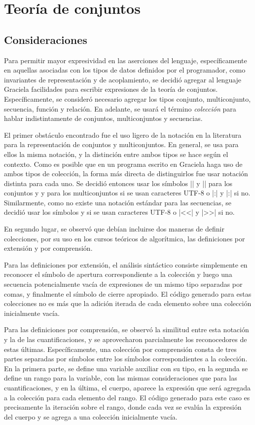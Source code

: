 {{\section{Teoría de conjuntos}
\subsection{Consideraciones}

Para permitir mayor expresividad en las aserciones del lenguaje, específicamente
en aquellas asociadas con los tipos de datos definidos por el programador, como
invariantes de representación y de acoplamiento, se decidió agregar al lenguaje
Graciela facilidades para escribir expresiones de la teoría de conjuntos.
Específicamente, se consideró necesario agregar los tipos conjunto,
multiconjunto, secuencia, función y relación. En adelante, se usará el término
\textit{colección} para hablar indistintamente de conjuntos, multiconjuntos y
secuencias.

El primer obstáculo encontrado fue el uso ligero de la notación en la literatura
para la representación de conjuntos y multiconjuntos. En general, se usa para
ellos la misma notación, y la distinción entre ambos tipos se hace según el
contexto. Como es posible que en un programa escrito en Graciela haga uso de
ambos tipos de colección, la forma más directa de distinguirlos fue usar
notación distinta para cada uno. Se decidió entonces usar los símbolos \ingra|{|
y \ingra|}| para los conjuntos y \Lbag{} y \Rbag{} para los multiconjuntos si se
usan caracteres UTF-8  o \ingra|{:| y \ingra|:}| si no. Similarmente, como no
existe una notación estándar para las secuencias, se decidió usar los símbolos
\Lseq{} y \Rseq{} si se usan caracteres UTF-8 o \ingra|<<| y \ingra|>>| si no.

En segundo lugar, se observó que debían incluirse dos maneras de definir
colecciones, por su uso en los cursos teóricos de algorítmica, las definiciones
por extensión y por comprensión.

Para las definiciones por extensión, el análisis sintáctico consiste simplemente
en reconocer el símbolo de apertura correspondiente a la colección y luego una
secuencia potencialmente vacía de expresiones de un mismo tipo separadas por
comas, y finalmente el símbolo de cierre apropiado. El código generado para
estas colecciones no es más que la adición iterada de cada elemento sobre una
colección inicialmente vacía.

Para las definiciones por comprensión, se observó la similitud entre esta
notación y la de las cuantificaciones, y se aprovecharon parcialmente los
reconocedores de estas últimas. Específicamente, una colección por comprensión
consta de tres partes separadas por símbolos \ingra{|} entre los símbolos
correspondientes a la colección. En la primera parte, se define una variable
auxiliar con su tipo, en la segunda se define un rango para la variable, con las
mismas consideraciones que para las cuantificaciones, y en la última, el cuerpo,
aparece la expresión que será agregada a la colección para cada elemento del
rango. El código generado para este caso es precisamente la iteración sobre el
rango, donde cada vez se evalúa la expresión del cuerpo y se agrega a una
colección inicialmente vacía.

}}
